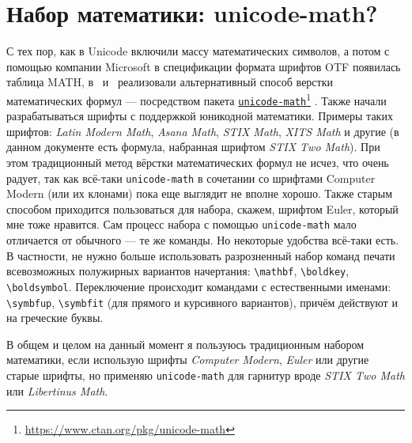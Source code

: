 \documentclass[a4paper,12pt]{article}
\newcommand\foothref[2]{%
  \href{#1}{#2}\footnote{\url{#1}}%
}
\newcommand\package[1]{\texttt{#1}}
\begin{document}
\section{Набор математики: unicode-math?}
С тех пор, как в Unicode включили массу математических символов, а потом с
помощью компании Microsoft в спецификации формата шрифтов OTF
появилась таблица MATH, в \LuaLaTeX\ и \XeTeX\ реализовали альтернативный
способ верстки математических формул --- посредством пакета
\foothref{https://www.ctan.org/pkg/unicode-math}{\package{unicode-math}}%
.
Также начали разрабатываться шрифты с поддержкой юникодной математики. Примеры таких
шрифтов: \emph{Latin Modern Math}, \emph{Asana Math}, \emph{STIX Math},
\emph{XITS Math} и другие (в данном документе есть формула, набранная
шрифтом \emph{STIX Two Math}).
При этом традиционный метод вёрстки математических формул не исчез, что
очень радует, так как всё-таки \package{unicode-math} в сочетании со шрифтами
Computer Modern (или их клонами) пока еще выглядит не вполне хорошо.
Также старым способом приходится пользоваться для набора, скажем, шрифтом
Euler, который мне тоже нравится. Сам процесс набора с помощью \package{unicode-math}
мало отличается от обычного --- те же команды. Но некоторые удобства всё-таки
есть. В частности, не нужно больше использовать разрозненный набор команд
печати всевозможных полужирных вариантов начертания: \verb|\mathbf|, \verb|\boldkey|,
\verb|\boldsymbol|. Переключение происходит командами с естественными именами:
\verb|\symbfup|, \verb|\symbfit| (для прямого и курсивного вариантов), причём
действуют и на греческие буквы.

В общем и целом на данный момент я пользуюсь традиционным набором математики,
если использую шрифты \emph{Computer Modern}, \emph{Euler} или другие старые шрифты, но
применяю \package{unicode-math} для гарнитур вроде \emph{STIX Two Math} или
\emph{Libertinus Math}.
\end{document}
